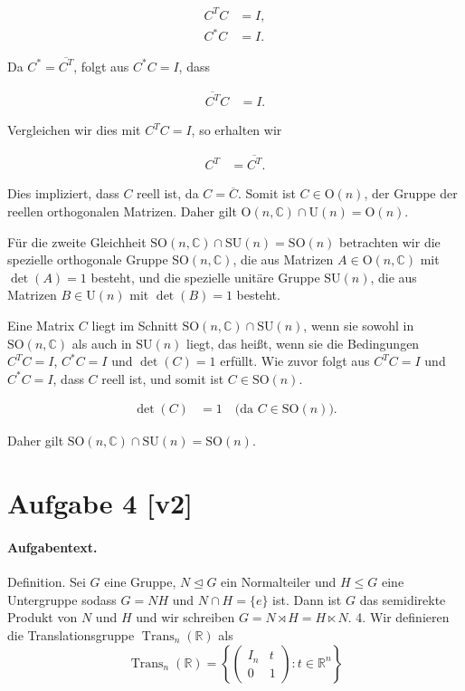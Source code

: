 \documentclass[11pt,a4paper]{article}
\begin{document}
\begin{align*}
C^T C &= I, \\
C^* C &= I.
\end{align*}

Da $C^* = \overline{C^T}$, folgt aus $C^* C = I$, dass

\begin{align*}
\overline{C^T} C &= I.
\end{align*}

Vergleichen wir dies mit $C^T C = I$, so erhalten wir

\begin{align*}
C^T &= \overline{C^T}.
\end{align*}

Dies impliziert, dass $C$ reell ist, da $C = \overline{C}$. Somit ist $C \in \mathrm{O}(n)$, der Gruppe der reellen orthogonalen Matrizen. Daher gilt $\mathrm{O}(n, \mathbb{C}) \cap \mathrm{U}(n) = \mathrm{O}(n)$.

Für die zweite Gleichheit $\mathrm{SO}(n, \mathbb{C}) \cap \mathrm{SU}(n) = \mathrm{SO}(n)$ betrachten wir die spezielle orthogonale Gruppe $\mathrm{SO}(n, \mathbb{C})$, die aus Matrizen $A \in \mathrm{O}(n, \mathbb{C})$ mit $\det(A) = 1$ besteht, und die spezielle unitäre Gruppe $\mathrm{SU}(n)$, die aus Matrizen $B \in \mathrm{U}(n)$ mit $\det(B) = 1$ besteht.

Eine Matrix $C$ liegt im Schnitt $\mathrm{SO}(n, \mathbb{C}) \cap \mathrm{SU}(n)$, wenn sie sowohl in $\mathrm{SO}(n, \mathbb{C})$ als auch in $\mathrm{SU}(n)$ liegt, das heißt, wenn sie die Bedingungen $C^T C = I$, $C^* C = I$ und $\det(C) = 1$ erfüllt. Wie zuvor folgt aus $C^T C = I$ und $C^* C = I$, dass $C$ reell ist, und somit ist $C \in \mathrm{SO}(n)$.

\begin{align*}
\det(C) &= 1 \quad \text{(da $C \in \mathrm{SO}(n)$)}.
\end{align*}

Daher gilt $\mathrm{SO}(n, \mathbb{C}) \cap \mathrm{SU}(n) = \mathrm{SO}(n)$.


\section*{Aufgabe 4 [v2]}
\paragraph{Aufgabentext.}
Definition. Sei $G$ eine Gruppe, $N \unlhd G$ ein Normalteiler und $H \leq G$ eine Untergruppe sodass $G=N H$ und $N \cap H=\{e\}$ ist. Dann ist $G$ das semidirekte Produkt von $N$ und $H$ und wir schreiben $G=N \rtimes H=H \ltimes N$.
4. Wir definieren die Translationsgruppe $\operatorname{Trans}_n(\mathbb{R})$ als
$$
\operatorname{Trans}_n(\mathbb{R})=\left\{\left(\begin{array}{cc}
I_n & t \\
0 & 1
\end{array}\right): t \in \mathbb{R}^n\right\}
$$
\end{document}

